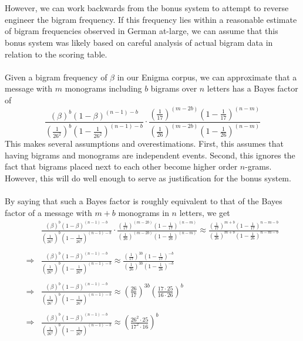 \\\\However, we can work backwards from the bonus system to attempt
to reverse engineer the bigram frequency. If this frequency lies
within a reasonable estimate of bigram frequencies observed in
German at-large, we can assume that this bonus system was likely
based on careful analysis of actual bigram data in relation to the
scoring table.
\\\\Given a bigram frequency of $\beta$ in our Enigma corpus, we
can approximate that a message with $m$ monograms including $b$
bigrams over $n$ letters has a Bayes factor of
\[
	\frac{(\beta)^b(1-\beta)^{(n-1)-b}}{(\frac{1}{26^2})^b(1-\frac{1}{26^2})^{(n-1)-b}}\cdot\frac{(\frac{1}{17})^{(m-2b)}(1-\frac{1}{17})^{(n-m)}}{(\frac{1}{26})^{(m-2b)}(1-\frac{1}{26})^{(n-m)}}
\]
This makes several assumptions and overestimations. First, this
assumes that having bigrams and monograms are independent events.
Second, this ignores the fact that bigrams placed next to each
other become higher order $n$-grams. However, this will do well
enough to serve as justification for the bonus system.
\\\\By saying that such a Bayes factor is roughly equivalent to
that of the Bayes factor of a message with $m+b$ monograms in $n$
letters, we get
\begin{align*}
	            &
	\frac{(\beta)^b(1-\beta)^{(n-1)-b}}{(\frac{1}{26^2})^b(1-\frac{1}{26^2})^{(n-1)-b}}\cdot\frac{(\frac{1}{17})^{(m-2b)}(1-\frac{1}{17})^{(n-m)}}{(\frac{1}{26})^{(m-2b)}(1-\frac{1}{26})^{(n-m)}}
	\approx
	\frac{(\frac{1}{17})^{m+b}(1-\frac{1}{17})^{n-m-b}}{(\frac{1}{26})^{m+b}(1-\frac{1}{26})^{n-m-b}}
	\\\\
	\Rightarrow &
	\frac{(\beta)^b(1-\beta)^{(n-1)-b}}{(\frac{1}{26^2})^b(1-\frac{1}{26^2})^{(n-1)-b}}\approx
	\frac{(\frac{1}{17})^{3b}(1-\frac{1}{17})^{-b}}{(\frac{1}{26})^{3b}(1-\frac{1}{26})^{-b}}
	\\\\
	\Rightarrow &
	\frac{(\beta)^b(1-\beta)^{(n-1)-b}}{(\frac{1}{26^2})^b(1-\frac{1}{26^2})^{(n-1)-b}}\approx
	(\frac{26}{17})^{3b}(\frac{17\cdot25}{16\cdot26})^b
	\\\\
	\Rightarrow &
	\frac{(\beta)^b(1-\beta)^{(n-1)-b}}{(\frac{1}{26^2})^b(1-\frac{1}{26^2})^{(n-1)-b}}\approx
	(\frac{26^2\cdot25}{17^2\cdot16})^b
\end{align*}

